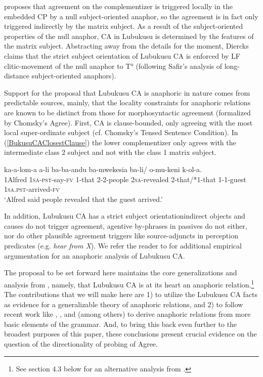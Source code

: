 \documentclass[output=paper
,modfonts
,nonflat
]{langsci/langscibook}
\begin{document}
\citet{Diercks:2013} proposes that agreement on the complementizer is triggered locally in the embedded CP by a null subject-oriented anaphor, so the agreement is in fact only triggered indirectly by the matrix subject. As a result of the subject-oriented properties of the null anaphor, CA in Lubukusu is determined by the features of the matrix subject. Abstracting away from the details for the moment, Diercks claims that the strict subject orientation of Lubukusu CA is enforced by LF clitic-movement of the null anaphor to T° (following Safir’s \citeyear{Safir:2004} analysis of long-distance subject-oriented anaphors). 

Support for the proposal that Lubukusu CA is anaphoric in nature comes from predictable sources, mainly, that the locality constraints for anaphoric relations are known to be distinct from those for morphosyntactic agreement (formalized by Chomsky’s \citeyear{Chomsky:2001} Agree). First, CA is clause-bounded, only agreeing with the most local super-ordinate subject (cf. Chomsky’s \citeyear{Chomsky:1973} Tensed Sentence Condition). In (\ref{BukusuCAClosestClause}) the lower complementizer only agrees with the intermediate class 2 subject and not with the class 1 matrix subject.

\ea \label{BukusuCAClosestClause}
\gll {} ka-a-lom-a a-li ba-ba-andu ba-mwekesia ba-li/ o-mu-keni k-ol-a. \\
1Alfred 1\textsc{sa}-\textsc{pst}-say-\textsc{fv} 1-that 2-2-people 2\textsc{sa}-revealed {2-that/*1-that} 1-1-guest 1\textsc{sa}.\textsc{pst}-arrived-\textsc{fv} \\
\glt `Alfred said people revealed that the guest arrived.'
\z

\noindent In addition, Lubukusu CA has a strict subject orientation\textemdash indirect objects and causes do not trigger agreement, agentive by-phrases in passives do not either, nor do other plausible agreement triggers like source-adjuncts in perception predicates (e.g. \textit{hear from X}). We refer the reader to \citet{Diercks:2010,Diercks:2013} for additional empirical argumentation for an anaphoric analysis of Lubukusu CA.

The proposal to be set forward here maintains the core generalizations and analysis from \citet{Diercks:2013}, namely, that Lubukusu CA is at its heart an anaphoric relation.\footnote{See section 4.3 below for an alternative analysis from \citet{Carstens:2016}.} The contributions that we will make here are 1) to utilize the Lubukusu CA facts as evidence for a generalizable theory of anaphoric relations, and 2) to follow recent work like \citet{Hicks:2009}, \citet{Reuland:2005,Reuland:2011}, and \citet{Rooryck:2011} (among others) to derive anaphoric relations from more basic elements of the grammar. And, to bring this back even further to the broadest purposes of this paper, these conclusions present crucial evidence on the question of the directionality of probing of Agree. 
\end{document}
